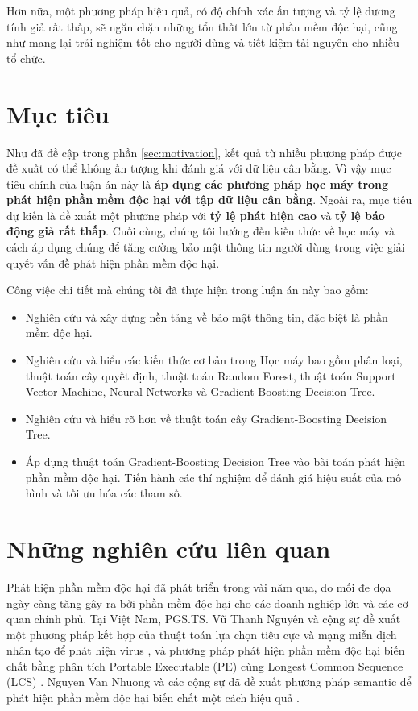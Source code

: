 Hơn nữa, một phương pháp hiệu quả, có độ chính xác ấn tượng và tỷ lệ dương tính giả rất thấp, sẽ ngăn chặn những tổn thất lớn từ phần mềm độc hại, cũng như mang lại trải nghiệm tốt cho người dùng và tiết kiệm tài nguyên cho nhiều tổ chức.

\section{Mục tiêu}
\label{sec:objectives}

Như đã đề cập trong phần \ref{sec:motivation}, kết quả từ nhiều phương pháp được đề xuất có thể không ấn tượng khi đánh giá với dữ liệu cân bằng.
Vì vậy mục tiêu chính của luận án này là \textbf{áp dụng các phương pháp học máy trong phát hiện phần mềm độc hại với tập dữ liệu cân bằng}. 
Ngoài ra, mục tiêu dự kiến là đề xuất một phương pháp với \textbf{tỷ lệ phát hiện cao} và \textbf{tỷ lệ báo động giả rất thấp}. 
Cuối cùng, chúng tôi hướng đến kiến thức về học máy và cách áp dụng chúng để tăng cường bảo mật thông tin người dùng trong việc giải quyết vấn đề phát hiện phần mềm độc hại.

Công việc chi tiết mà chúng tôi đã thực hiện trong luận án này bao gồm:

\begin{itemize}
    \item Nghiên cứu và xây dựng nền tảng về bảo mật thông tin, đặc biệt là phần mềm độc hại.
    \item Nghiên cứu và hiểu các kiến thức cơ bản trong Học máy bao gồm phân loại, thuật toán cây quyết định, thuật toán Random Forest, thuật toán Support Vector Machine, Neural Networks và Gradient-Boosting Decision Tree.
    \item Nghiên cứu và hiểu rõ hơn về thuật toán cây Gradient-Boosting Decision Tree.
    \item Áp dụng thuật toán Gradient-Boosting Decision Tree vào bài toán phát hiện phần mềm độc hại. Tiến hành các thí nghiệm để đánh giá hiệu suất của mô hình và tối ưu hóa các tham số.
\end{itemize}

\section{Những nghiên cứu liên quan}

Phát hiện phần mềm độc hại đã phát triển trong vài năm qua, do mối đe dọa ngày càng tăng gây ra bởi phần mềm độc hại cho các doanh nghiệp lớn và các cơ quan chính phủ.
Tại Việt Nam, PGS.TS. Vũ Thanh Nguyên và cộng sự đề xuất một phương pháp kết hợp của thuật toán lựa chọn tiêu cực và mạng miễn dịch nhân tạo để phát hiện virus \cite{nguyen2014combination}, và phương pháp phát hiện phần mềm độc hại biến chất bằng phân tích Portable Executable (PE) cùng Longest Common Sequence (LCS) \cite{vu2017metamorphic}.
Nguyen Van Nhuong và các cộng sự đã đề xuất phương pháp semantic để phát hiện phần mềm độc hại biến chất một cách hiệu quả \cite{van2014semantic}.


